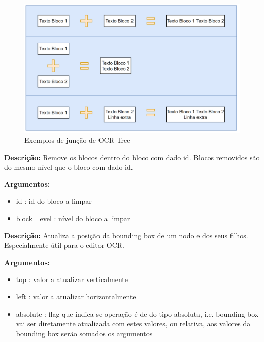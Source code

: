 \begin{figure}[H]
	\centering
	\includegraphics[width=1\textwidth]{images/ilustracoes/ocr_tree_join_trees_example.png}
	\caption{Exemplos de junção de OCR Tree}
	\label{fig:ocr_tree_join_trees_example}
\end{figure}



\textbf{Descrição:} Remove os blocos dentro do bloco com dado id. Blocos removidos são do mesmo nível que o bloco com dado id.


\textbf{Argumentos:}
\begin{itemize}\setlength\itemsep{-0.3em}
	\vspace{-0.5em}
	\item id : id do bloco a limpar
	\item block\_level : nível do bloco a limpar
\end{itemize}


\textbf{Descrição:} Atualiza a posição da bounding box de um nodo e dos seus filhos. Especialmente útil para o editor OCR.


\textbf{Argumentos:}
\begin{itemize}\setlength\itemsep{-0.3em}
	\vspace{-0.5em}
	\item top : valor a atualizar verticalmente
	\item left : valor a atualizar horizontalmente
	\item absolute : flag que indica se operação é de do tipo absoluta, i.e. bounding box vai ser diretamente atualizada com estes valores, ou relativa, aos valores da bounding box serão somados os argumentos
\end{itemize}

